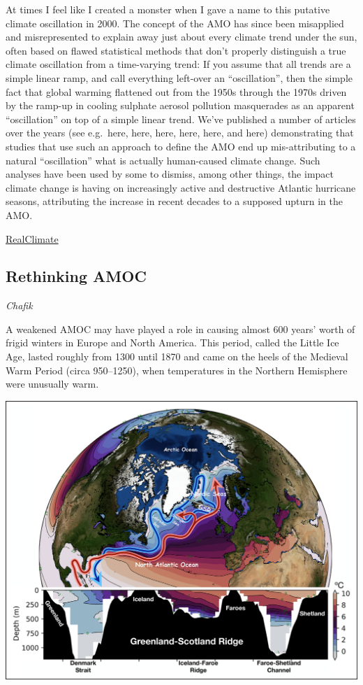 \documentclass[
]{book}
\begin{document}
At times I feel like I created a monster when I gave a name to this putative climate oscillation in 2000. The concept of the AMO has since been misapplied and misrepresented to explain away just about every climate trend under the sun, often based on flawed statistical methods that don't properly distinguish a true climate oscillation from a time-varying trend: If you assume that all trends are a simple linear ramp, and call everything left-over an ``oscillation'', then the simple fact that global warming flattened out from the 1950s through the 1970s driven by the ramp-up in cooling sulphate aerosol pollution masquerades as an apparent ``oscillation'' on top of a simple linear trend. We've published a number of articles over the years (see e.g.~here, here, here, here, here, and here) demonstrating that studies that use such an approach to define the AMO end up mis-attributing to a natural ``oscillation'' what is actually human-caused climate change. Such analyses have been used by some to dismiss, among other things, the impact climate change is having on increasingly active and destructive Atlantic hurricane seasons, attributing the increase in recent decades to a supposed upturn in the AMO.

\href{http://www.realclimate.org/index.php/archives/2021/03/the-rise-and-fall-of-the-atlantic-multidecadal-oscillation/}{RealClimate}

\hypertarget{rethinking-amoc}{%
\subsection{Rethinking AMOC}\label{rethinking-amoc}}

\emph{Chafik}

A weakened AMOC may have played a role in causing almost 600 years' worth of frigid winters in Europe and North America. This period, called the Little Ice Age, lasted roughly from 1300 until 1870 and came on the heels of the Medieval Warm Period (circa 950--1250), when temperatures in the Northern Hemisphere were unusually warm.

\includegraphics{fig/surface-deep-circulation-north-atlantic.png}
\end{document}
